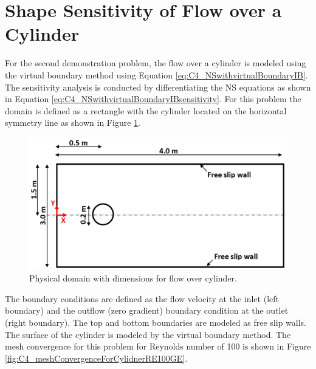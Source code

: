 \section{Shape Sensitivity of Flow over a Cylinder}
For the second demonstration problem, the flow over a cylinder is modeled using the virtual boundary method using Equation \eqref{eq:C4_NSwithvirtualBoundaryIB}. The sensitivity analysis is conducted by differentiating the NS equations as shown in Equation \eqref{eq:C4_NSwithvirtualBoundaryIBsensitivity}. For this problem the domain is defined as a rectangle with the cylinder located on the horizontal symmetry line as shown in Figure \ref{fig:C4_cylinderPhysicalDomain}.

\begin{figure}[H]
    \centering
    \includegraphics[width=12.00cm]{Chapter_4/figure/flow_over_cylinder/flow_over_cylinder.png}
    \caption{Physical domain with dimensions for flow over cylinder.}
    \label{fig:C4_cylinderPhysicalDomain}
\end{figure}

The boundary conditions are defined as the flow velocity at the inlet (left boundary) and the outflow (zero gradient) boundary condition at the outlet (right boundary). The top and bottom boundaries are modeled as free slip walls. The surface of the cylinder is modeled by the virtual boundary method. The mesh convergence for this problem for Reynolds number of 100 is shown in Figure \ref{fig:C4_meshConvergenceForCylidnerRE100GE}.

